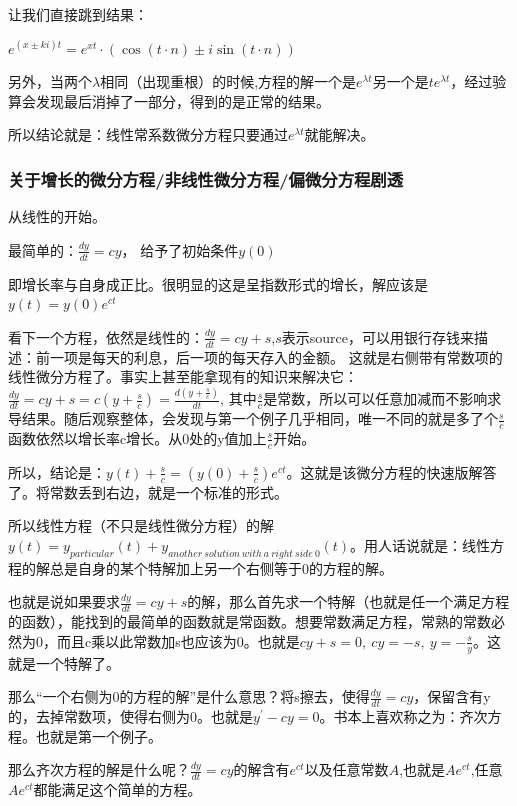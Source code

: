 \documentclass[UTF8]{ctexbook}
\newcommand{\derivative}{^\prime}
\begin{document}
{{{{让我们直接跳到结果：

$e^{(x \pm ki)t} = e^{xt}\cdot(\cos(t\cdot n) \pm i\sin(t\cdot n))$

另外，当两个$\lambda$相同（出现重根）的时候,方程的解一个是$e^{\lambda t}$另一个是$te^{\lambda t}$，经过验算会发现最后消掉了一部分，得到的是正常的结果。

所以结论就是：线性常系数微分方程只要通过$e^{\lambda t}$就能解决。
}%

\subsubsection{关于增长的微分方程/非线性微分方程/偏微分方程剧透}{
  从线性的开始。

  最简单的：$\frac{dy}{dt} = cy$， 给予了初始条件$y(0)$

  即增长率与自身成正比。很明显的这是呈指数形式的增长，解应该是$y(t) = y(0)e^{ct}$

  看下一个方程，依然是线性的：$\frac{dy}{dt} = cy + s$,$s$表示source，可以用银行存钱来描述：前一项是每天的利息，后一项的每天存入的金额。
  这就是右侧带有常数项的线性微分方程了。事实上甚至能拿现有的知识来解决它：$\frac{dy}{dt} = cy + s = c(y + \frac{s}{c}) = \frac{d(y + \frac{s}{c})}{dt}$, 其中$\frac{s}{c}$是常数，所以可以任意加减而不影响求导结果。随后观察整体，会发现与第一个例子几乎相同，唯一不同的就是多了个$\frac{s}{c}$函数依然以增长率c增长。从0处的y值加上$\frac{s}{c}$开始。

  所以，结论是：$y(t) + \frac{s}{c} = (y(0) + \frac{s}{c})e^{ct}$。这就是该微分方程的快速版解答了。将常数丢到右边，就是一个标准的形式。

  所以线性方程（不只是线性微分方程）的解$y(t) = y_{particular}(t) + y_{another\ solution\ with\ a\ right\ side\ 0}(t)$。用人话说就是：线性方程的解总是自身的某个特解加上另一个右侧等于0的方程的解。

  也就是说如果要求$\frac{dy}{dt} = cy + s$的解，那么首先求一个特解（也就是任一个满足方程的函数），能找到的最简单的函数就是常函数。想要常数满足方程，常熟的常数必然为0，而且c乘以此常数加s也应该为0。也就是$cy + s = 0,\ cy = -s, \ y = -\frac{s}{y}$。这就是一个特解了。

  那么“一个右侧为0的方程的解”是什么意思？将s擦去，使得$\frac{dy}{dt} = cy$，保留含有y的，去掉常数项，使得右侧为0。也就是$y\derivative - cy = 0$。书本上喜欢称之为：齐次方程。也就是第一个例子。

  那么齐次方程的解是什么呢？$\frac{dy}{dt} = cy$的解含有$e^{ct}$以及任意常数$A$,也就是$Ae^{ct}$,任意$Ae^{ct}$都能满足这个简单的方程。

}}}}
\end{document}
